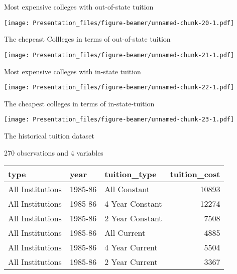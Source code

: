 \documentclass[
  ignorenonframetext,
]{beamer}
\begin{document}
\begin{frame}{Most expensive colleges with out-of-state tuition}
\protect\hypertarget{most-expensive-colleges-with-out-of-state-tuition}{}

\texttt{[image: Presentation\_files/figure-beamer/unnamed-chunk-20-1.pdf]}

\end{frame}

\begin{frame}{The chepeast Collleges in terms of out-of-state tuition}
\protect\hypertarget{the-chepeast-collleges-in-terms-of-out-of-state-tuition}{}

\texttt{[image: Presentation\_files/figure-beamer/unnamed-chunk-21-1.pdf]}

\end{frame}

\begin{frame}{Most expensive colleges with in-state tuition}
\protect\hypertarget{most-expensive-colleges-with-in-state-tuition}{}

\texttt{[image: Presentation\_files/figure-beamer/unnamed-chunk-22-1.pdf]}

\end{frame}

\begin{frame}{The cheapest colleges in terms of in-state-tuition}
\protect\hypertarget{the-cheapest-colleges-in-terms-of-in-state-tuition}{}

\texttt{[image: Presentation\_files/figure-beamer/unnamed-chunk-23-1.pdf]}

\end{frame}

\begin{frame}{The historical tuition dataset}
\protect\hypertarget{the-historical-tuition-dataset}{}

\begin{block}{270 observations and 4 variables}

\begin{table}[H]
\centering
\begin{tabular}{l|l|l|r}
\hline
type & year & tuition\_type & tuition\_cost\\
\hline
All Institutions & 1985-86 & All Constant & 10893\\
\hline
All Institutions & 1985-86 & 4 Year Constant & 12274\\
\hline
All Institutions & 1985-86 & 2 Year Constant & 7508\\
\hline
All Institutions & 1985-86 & All Current & 4885\\
\hline
All Institutions & 1985-86 & 4 Year Current & 5504\\
\hline
All Institutions & 1985-86 & 2 Year Current & 3367\\
\hline
\end{tabular}
\end{table}

\end{block}

\end{frame}
\end{document}
